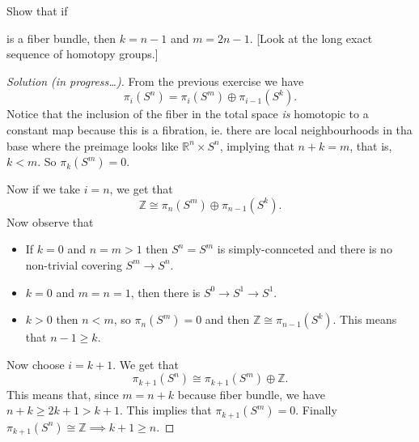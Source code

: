 \documentclass{article}
\numberwithin{equation}{section}
\newcommand{\R}{\mathbb{R}}
\newcommand{\Z}{\mathbb{Z}}
\begin{document}
\begin{exercise}[4.2.32]
	Show that if  is a fiber bundle, then $k=n-1$ and $m=2n-1$. [Look at the long exact sequence of homotopy groups.]
\end{exercise}
\begin{proof}[Solution (in progress…)]
	From the previous exercise we have
	\[
	\pi_i(S^n)=\pi_i(S^m)\oplus\pi_{i-1}(S^k)
	.\]
	Notice that the inclusion of the fiber in the total space \textit{is} homotopic to a constant map because this is a fibration, ie. there are local neighbourhoods in tha base where the preimage looks like $\R^n\times S^n$, implying that $n+k=m$, that is, $k<m$. So $\pi_k(S^m)=0$.

	Now if we take $i=n$, we get that
	\[
	\Z\cong \pi_{n}(S^m)\oplus\pi_{n-1}(S^k)
	.\]
	Now observe that
	\begin{itemize}
		\item If $k=0$ and $n=m>1$ then $S^n=S^m$ is simply-connceted and there is no non-trivial covering $S^m\to S^n$.
		\item $k=0$  and $m=n=1$, then there is $S^0\to S^1\to S^1$.
		\item $k>0$ then $n<m$, so $\pi_{n}(S^m)=0$ and then $\Z\cong \pi_{n-1}(S^k)$. This means that $n-1\geq k$.
	\end{itemize}

	Now choose $i=k+1$. We get that
\[
\pi_{k+1}(S^n)\cong \pi_{k+1}(S^m)\oplus\Z
.\]
This means that, since $m=n+k$ because fiber bundle, we have $n+k\geq 2k+1>k+1$. This implies that $\pi_{k+1}(S^m)=0$. Finally $\pi_{k+1}(S^n)\cong \Z\implies k+1\geq n$.
\end{proof}
\end{document}
